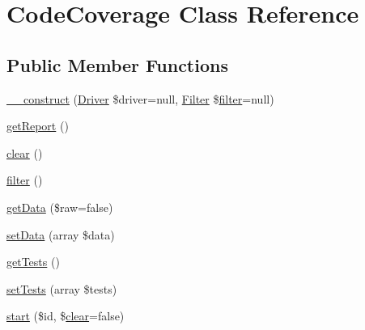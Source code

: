 \hypertarget{class_sebastian_bergmann_1_1_code_coverage_1_1_code_coverage}{}\section{Code\+Coverage Class Reference}
\label{class_sebastian_bergmann_1_1_code_coverage_1_1_code_coverage}
\subsection*{Public Member Functions}
\begin{DoxyCompactItemize}
\item 
\mbox{\hyperlink{class_sebastian_bergmann_1_1_code_coverage_1_1_code_coverage_a94e4e6474f7c4fbff9031fd4fcb1b474}{\+\_\+\+\_\+construct}} (\mbox{\hyperlink{interface_sebastian_bergmann_1_1_code_coverage_1_1_driver_1_1_driver}{Driver}} \$driver=null, \mbox{\hyperlink{class_sebastian_bergmann_1_1_code_coverage_1_1_filter}{Filter}} \$\mbox{\hyperlink{class_sebastian_bergmann_1_1_code_coverage_1_1_code_coverage_a8122d3c1ef2a61359b75a97363a4d89b}{filter}}=null)
\item 
\mbox{\hyperlink{class_sebastian_bergmann_1_1_code_coverage_1_1_code_coverage_a36065960e56a8f2637e2fb05bc233c80}{get\+Report}} ()
\item 
\mbox{\hyperlink{class_sebastian_bergmann_1_1_code_coverage_1_1_code_coverage_aa821bec12eaa7e0f649397c9675ff505}{clear}} ()
\item 
\mbox{\hyperlink{class_sebastian_bergmann_1_1_code_coverage_1_1_code_coverage_a8122d3c1ef2a61359b75a97363a4d89b}{filter}} ()
\item 
\mbox{\hyperlink{class_sebastian_bergmann_1_1_code_coverage_1_1_code_coverage_a9e4f10fba0a72e8c5996f208ff0b5ff4}{get\+Data}} (\$raw=false)
\item 
\mbox{\hyperlink{class_sebastian_bergmann_1_1_code_coverage_1_1_code_coverage_a87449bdd364c33ff024d32896342bf31}{set\+Data}} (array \$data)
\item 
\mbox{\hyperlink{class_sebastian_bergmann_1_1_code_coverage_1_1_code_coverage_a7e247dd31cc8d37a6c97353a062a0080}{get\+Tests}} ()
\item 
\mbox{\hyperlink{class_sebastian_bergmann_1_1_code_coverage_1_1_code_coverage_a1607846b217222c6cdb30a847bdd0379}{set\+Tests}} (array \$tests)
\item 
\mbox{\hyperlink{class_sebastian_bergmann_1_1_code_coverage_1_1_code_coverage_ada10201232dd18f2f08d15b4d97b4dbf}{start}} (\$id, \$\mbox{\hyperlink{class_sebastian_bergmann_1_1_code_coverage_1_1_code_coverage_aa821bec12eaa7e0f649397c9675ff505}{clear}}=false)

\end{DoxyCompactItemize}
